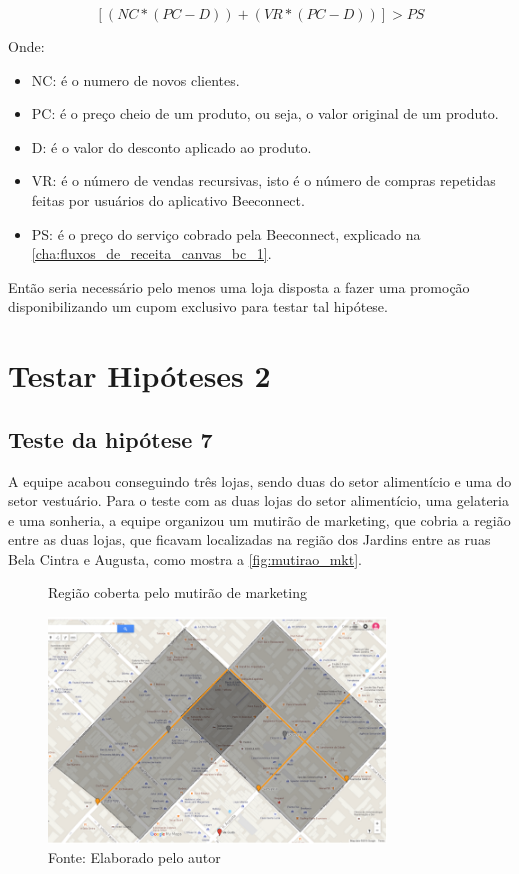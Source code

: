 \[[(NC * (PC - D)) + (VR * (PC - D))] > PS\]

Onde: 
\begin{itemize}
\item NC: é o numero de novos clientes.
\item PC: é o preço cheio de um produto, ou seja, o valor original de um produto.
\item D: é o valor do desconto aplicado ao produto.
\item VR: é o número de vendas recursivas, isto é o número de compras repetidas feitas por usuários do aplicativo Beeconnect.
\item PS: é o preço do serviço cobrado pela Beeconnect, explicado na \autoref{cha:fluxos_de_receita_canvas_bc_1}.
\end{itemize}

Então seria necessário pelo menos uma loja disposta a fazer uma promoção disponibilizando um cupom exclusivo para testar tal hipótese.
\section{Testar Hipóteses 2}
\label{cha:testar_hipoteses_2}

\subsection{Teste da hipótese 7}
\label{cha:teste_hipotese_7}
A equipe acabou conseguindo três lojas, sendo duas do setor alimentício e uma do setor vestuário. Para o teste com as duas lojas do setor alimentício, uma gelateria e uma sonheria, a equipe organizou um mutirão de marketing, que cobria a região entre as duas lojas, que ficavam localizadas na região dos Jardins entre as ruas Bela Cintra e Augusta, como mostra a \autoref{fig:mutirao_mkt}.
\begin{figure}[H]
\caption{Região coberta pelo mutirão de marketing}
\centerline{\includegraphics[width=0.8\textwidth]{img/mutirao_mkt}}
\label{fig:mutirao_mkt}
\caption* {Fonte: Elaborado pelo autor}
\end{figure}

